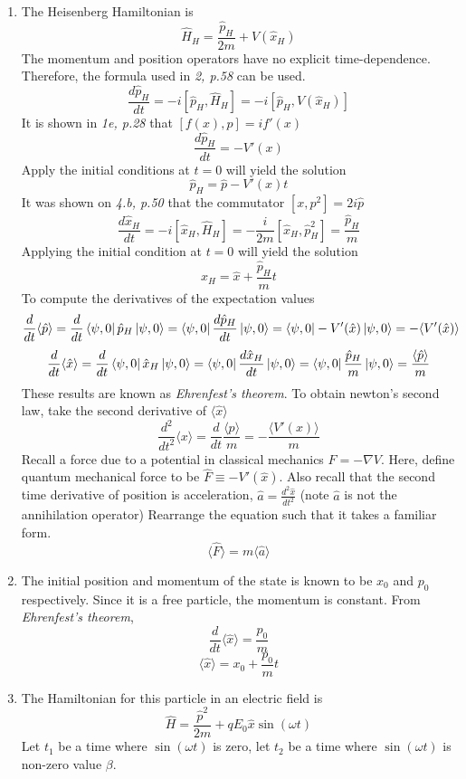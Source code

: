 \begin{sol}
\begin{enumerate}[label=\textbf{(\alph*)}]
\item
The Heisenberg Hamiltonian is 
$$\hat H_H=\frac{\hat p_H}{2m}+V(\hat x_H)$$ 
The momentum and position operators have no explicit time-dependence. Therefore, the formula used in \textit{2, p.58} can be used. 
$$\frac{d\hat p_H}{dt}=-i[\hat p_H,\hat H_H]=-i[\hat p_H,V(\hat x_H)]$$
It is shown in \textit{1e, p.28} that $[f(x),p]=if'(x)$ 
$$\frac{d\hat p_H}{dt}=-V'(x)$$
Apply the initial conditions at $t=0$ will yield the solution
$$\hat p_H=\hat p-V'(x)t$$ 
It was shown on \textit{4.b, p.50} that the commutator $[x,p^2]=2i\hat p$ 
$$\frac{d\hat x_H}{dt}=-i[\hat x_H,\hat H_H]=-\frac{i}{2m}[\hat x_H,\hat p_H^2]=\frac{\hat p_H}{m}$$
Applying the initial condition at $t=0$ will yield the solution
$$\hat x_H=\hat x+\frac{\hat p_H}{m}t$$
To compute the derivatives of the expectation values
$$\frac{d}{dt}\langle \hat p\rangle=\frac{d}{dt}\bra{\psi,0}\hat p_H\ket{\psi,0}=\bra{\psi,0}\frac{d\hat p_H}{dt}\ket{\psi,0}=\bra{\psi,0}-V'(\hat x)\ket{\psi,0}=-\langle V'(\hat{x})\rangle$$ 
$$\frac{d}{dt}\langle\hat x\rangle=\frac{d}{dt}\bra{\psi,0}\hat x_H\ket{\psi,0}=\bra{\psi,0}\frac{d\hat x_H}{dt}\ket{\psi,0}=\bra{\psi,0}\frac{\hat p_H}{m}\ket{\psi,0}=\frac{\langle \hat p\rangle}{m}$$ 
These results are known as \textit{Ehrenfest's theorem}. To obtain newton's second law, take the second derivative of $\langle \hat x\rangle$
$$\frac{d^2}{dt^2}\langle x\rangle=\frac{d}{dt}\frac{\langle p\rangle}{m}=-\frac{\langle V'(x)\rangle}{m}$$ 
Recall a force due to a potential in classical mechanics $F=-\nabla V$. Here, define quantum mechanical force to be $\hat F\equiv-V'(\hat x)$. Also recall that the second time derivative of position is acceleration, $\hat a=\frac{d^2\hat x}{dt^2}$  (note $\hat a$ is not the annihilation operator) Rearrange the equation such that it takes a familiar form.
$$\langle\hat F\rangle=m\langle\hat a\rangle$$ 
\item
The initial position and momentum of the state is known to be $x_0$ and $p_0$ respectively. Since it is a free particle, the momentum is constant. From \textit{Ehrenfest's theorem}, 
$$\frac{d}{dt}\langle\hat x\rangle=\frac{p_0}{m}$$
$$\langle\hat x\rangle=x_0+\frac{p_0}{m}t$$ 
\item
The Hamiltonian for this particle in an electric field is
$$\hat H=\frac{\hat p^2}{2m}+qE_0\hat x\sin(\omega t)$$
Let $t_1$ be a time where $\sin(\omega t)$ is zero, let $t_2$ be a time where $\sin(\omega t)$ is non-zero value $\beta$.

\end{enumerate}
\end{sol}
